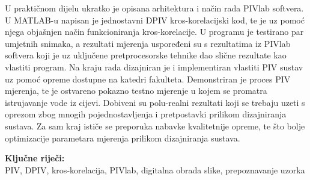 U praktičnom dijelu ukratko je opisana arhitektura i način rada PIVlab softvera. U MATLAB-u napisan je jednostavni DPIV kros-korelacijski kod, te je uz pomoć njega objašnjen način funkcioniranja kros-korelacije. U programu je testirano par umjetnih snimaka, a rezultati mjerenja uspoređeni su s rezultatima iz PIVlab softvera koji je uz uključene pretprocesorske tehnike dao slične rezultate kao vlastiti program. Na kraju rada dizajniran je i implementiran vlastiti PIV sustav uz pomoć opreme dostupne na katedri fakulteta. Demonstriran je proces PIV mjerenja, te je ostvareno pokazno testno mjerenje u kojem se promatra istrujavanje vode iz cijevi. Dobiveni su polu-realni rezultati koji se trebaju uzeti s oprezom zbog mnogih pojednostavljenja i pretpostavki prilikom dizajniranja sustava. Za sam kraj ističe se preporuka nabavke kvalitetnije opreme, te što bolje optimizacije parametara mjerenja prilikom dizajniranja sustava.
\vskip 3mm
\begin{flushleft}	
{
	\normalsize{\bf{Ključne riječi:\\}}
	\textnormal{PIV, DPIV, kros-korelacija, PIVlab, digitalna obrada slike, prepoznavanje uzorka}
}	
\end{flushleft}
